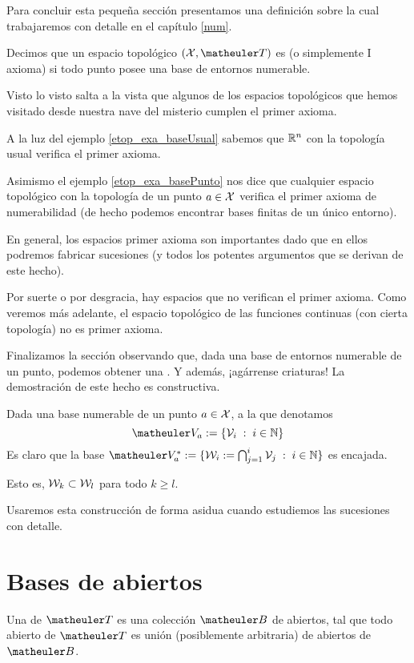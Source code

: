 Para concluir esta pequeña sección presentamos una definición sobre la cual trabajaremos con detalle en el capítulo \ref{num}.

\begin{defi}
	Decimos que un espacio topológico $(\X,\T)$ es  (o simplemente I axioma) si todo punto posee una base de entornos numerable.
\end{defi}
Visto lo visto salta a la vista que algunos de los espacios topológicos que hemos visitado desde nuestra nave del misterio cumplen el primer axioma.
\begin{exa}
	A la luz del ejemplo \ref{etop_exa_baseUsual} sabemos que $\mathbb{R}^n$ con la topología usual verifica el primer axioma.
	
	Asimismo el ejemplo \ref{etop_exa_basePunto} nos dice que cualquier espacio topológico con la topología de un punto $a\in\mathcal{X}$ verifica el primer axioma de numerabilidad (de hecho podemos encontrar bases finitas de un único entorno).
\end{exa}
En general, los espacios primer axioma son importantes dado que en ellos podremos fabricar sucesiones (y todos los potentes argumentos que se derivan de este hecho).

Por suerte o por desgracia, hay espacios que no verifican el primer axioma. Como veremos más adelante, el espacio topológico de las funciones continuas (con cierta topología) no es primer axioma.

Finalizamos la sección observando que, dada una base de entornos numerable de un punto, podemos obtener una . Y además, ¡agárrense criaturas! La demostración de este hecho es constructiva.
\begin{obs}
	\label{etop_obs_base_encajada}
	Dada una base numerable de un punto $a\in\mathcal{X}$, a la que denotamos
	\begin{equation*}
		\Va{a}:=\{\V_i\midc i\in\N\}
	\end{equation*}
	Es claro que la base $\Va{a}^*:=\{\W_i:=\bigcap_{j=1}^i\V_j\midc i\in\N\}$ es encajada.
	
	Esto es, $\mathcal{W}_k\subset\mathcal{W}_l$ para todo $k\geq l$.
\end{obs}
Usaremos esta construcción de forma asidua cuando estudiemos las sucesiones con detalle.
\section{Bases de abiertos}
\begin{defi}
	\label{etop_bases_abiertos}
	Una  de $\T$ es una colección $\B$ de abiertos, tal que todo abierto de $\T$ es unión (posiblemente arbitraria) de abiertos de $\B$.
\end{defi}


